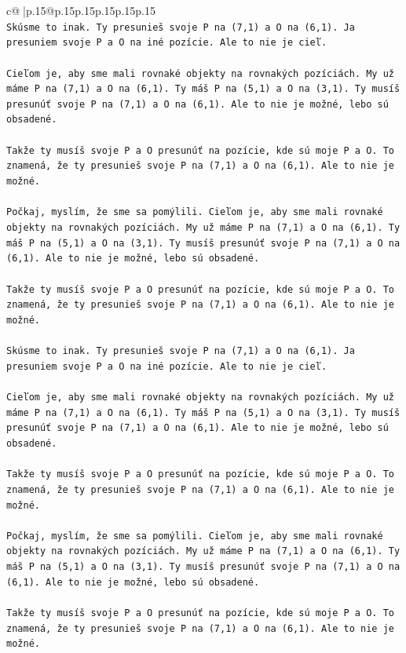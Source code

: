 \documentclass{article}
\begin{document}
{\begin{supertabular}{c@{$\;$}|p{.15\linewidth}@{}p{.15\linewidth}p{.15\linewidth}p{.15\linewidth}p{.15\linewidth}p{.15\linewidth}}
{{{\\ 
\texttt{Skúsme to inak. Ty presunieš svoje P na (7,1) a O na (6,1). Ja presuniem svoje P a O na iné pozície. Ale to nie je cieľ.} \\
\\ 
\texttt{Cieľom je, aby sme mali rovnaké objekty na rovnakých pozíciách. My už máme P na (7,1) a O na (6,1). Ty máš P na (5,1) a O na (3,1). Ty musíš presunúť svoje P na (7,1) a O na (6,1). Ale to nie je možné, lebo sú obsadené.} \\
\\ 
\texttt{Takže ty musíš svoje P a O presunúť na pozície, kde sú moje P a O. To znamená, že ty presunieš svoje P na (7,1) a O na (6,1). Ale to nie je možné.} \\
\\ 
\texttt{Počkaj, myslím, že sme sa pomýlili. Cieľom je, aby sme mali rovnaké objekty na rovnakých pozíciách. My už máme P na (7,1) a O na (6,1). Ty máš P na (5,1) a O na (3,1). Ty musíš presunúť svoje P na (7,1) a O na (6,1). Ale to nie je možné, lebo sú obsadené.} \\
\\ 
\texttt{Takže ty musíš svoje P a O presunúť na pozície, kde sú moje P a O. To znamená, že ty presunieš svoje P na (7,1) a O na (6,1). Ale to nie je možné.} \\
\\ 
\texttt{Skúsme to inak. Ty presunieš svoje P na (7,1) a O na (6,1). Ja presuniem svoje P a O na iné pozície. Ale to nie je cieľ.} \\
\\ 
\texttt{Cieľom je, aby sme mali rovnaké objekty na rovnakých pozíciách. My už máme P na (7,1) a O na (6,1). Ty máš P na (5,1) a O na (3,1). Ty musíš presunúť svoje P na (7,1) a O na (6,1). Ale to nie je možné, lebo sú obsadené.} \\
\\ 
\texttt{Takže ty musíš svoje P a O presunúť na pozície, kde sú moje P a O. To znamená, že ty presunieš svoje P na (7,1) a O na (6,1). Ale to nie je možné.} \\
\\ 
\texttt{Počkaj, myslím, že sme sa pomýlili. Cieľom je, aby sme mali rovnaké objekty na rovnakých pozíciách. My už máme P na (7,1) a O na (6,1). Ty máš P na (5,1) a O na (3,1). Ty musíš presunúť svoje P na (7,1) a O na (6,1). Ale to nie je možné, lebo sú obsadené.} \\
\\ 
\texttt{Takže ty musíš svoje P a O presunúť na pozície, kde sú moje P a O. To znamená, že ty presunieš svoje P na (7,1) a O na (6,1). Ale to nie je možné.} \\
}}}
\end{supertabular}}
\end{document}

